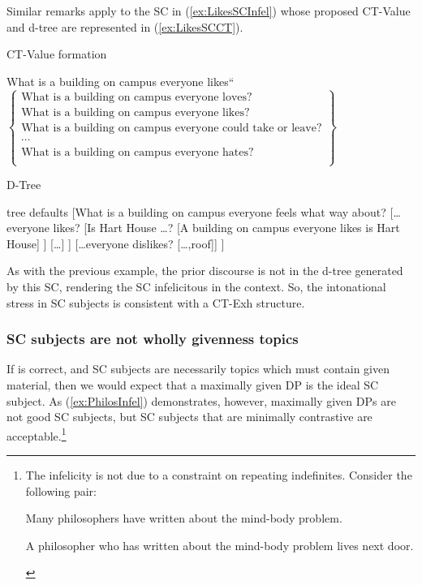 \documentclass[
]{RCL}
\begin{document}
Similar remarks apply to the SC in (\ref{ex:LikesSCInfel}) whose proposed CT-Value and d-tree are represented in (\ref{ex:LikesSCCT}).
\begin{exe}
	\ex\label{ex:LikesSCCT}
	\begin{xlist}
		\ex CT-Value formation
		\begin{xlist}
			 What is a building on campus everyone likes``
			 $
			\begin{Bmatrix}
				\text{What is a building on campus everyone loves?}\\
				\text{What is a building on campus everyone likes?}\\
				\text{What is a building on campus everyone could take or leave?}\\
				\cdots\\
				\text{What is a building on campus everyone hates?}\\
			\end{Bmatrix}
			$			
		\end{xlist}
		\ex D-Tree\\
		\hspace{-2cm}
		\begin{forest}
			tree defaults
			[What is a building on campus everyone feels what way about?
				[\ldots everyone likes?
					[Is Hart House \ldots?
						[A building on campus everyone likes is Hart House]
					]
					[\ldots]
				]
				[\ldots everyone dislikes?
				[\ldots,roof]]
			]
		\end{forest}	
	\end{xlist}
\end{exe}
As with the previous example, the prior discourse is not in the d-tree generated by this SC, rendering the SC infelicitous in the context.
So, the intonational stress in SC subjects is consistent with a CT-Exh structure.
\subsubsection{SC subjects are not wholly givenness topics}
If \citet{mikkelsen2005copular} is correct, and SC subjects are necessarily topics which must contain given material, then we would expect that a maximally given DP is the ideal SC subject.
As (\ref{ex:PhilosInfel}) demonstrates, however, maximally given DPs are not good SC subjects, but SC subjects that are minimally contrastive are acceptable.\footnote{
  The infelicity is not due to a constraint on repeating indefinites.
  Consider the following pair:
  \begin{xlisti}
	  \ex Many philosophers have written about the mind-body problem.
	  \begin{xlista}
		  \ex A philosopher who has written about the mind-body problem lives next door.
	  \end{xlista}	  
  \end{xlisti}
}
\end{document}

